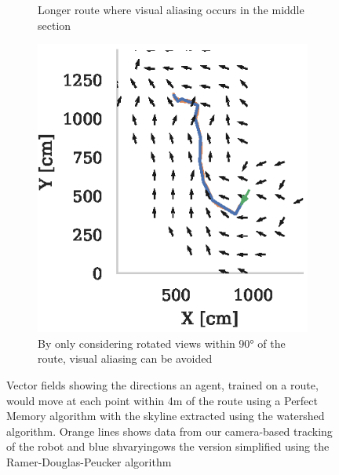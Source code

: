\documentclass[letterpaper]{article}
\begin{document}
\begin{figure}[t]
\begin{subfigure}[t]{0.3\textwidth}
        \caption{Longer route where visual aliasing occurs in the middle section}
        \label{fig:vector_fields/route5_perfect_memory_mask}
    \end{subfigure}
    \begin{subfigure}[t]{0.3\textwidth}
        \includegraphics{figures/vector_field_route5_PerfectMemoryConstrained_mask.eps}
        \caption{By only considering rotated views within 90° of the route, visual aliasing can be avoided}
        \label{fig:vector_fields/route5_perfect_memory_constrained_mask}
    \end{subfigure}
    
    \caption{Vector fields showing the directions an agent, trained on a route, would move at each point within 4m of the route using a Perfect Memory algorithm with the skyline extracted using the watershed algorithm. 
    Orange lines shows data from our camera-based tracking of the robot and blue shvaryingows the version simplified using the Ramer-Douglas-Peucker algorithm~\citep{Ramer1972}}
    \label{fig:vector_fields}
\end{figure}
\end{document}
